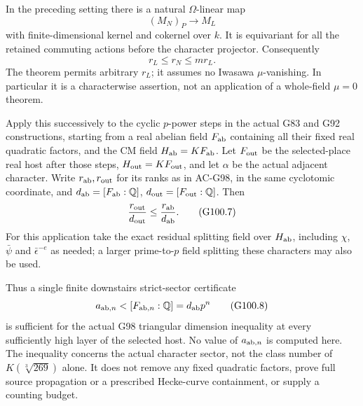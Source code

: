 \begin{theorem}
\label{thm:ACG100ascent}
In the preceding setting there is a natural $\Omega$-linear map
\[
                         (M_N)_P\longrightarrow M_L
 \tag{G100.5}
\]
with finite-dimensional kernel and cokernel over $k$.
It is equivariant for all the retained commuting actions before
the character projector.  Consequently
\[
                 r_L\le r_N\le m r_L.
 \tag{G100.6}
\]
The theorem permits arbitrary $r_L$; it assumes no Iwasawa
$\mu$-vanishing.  In particular it is a characterwise assertion,
not an application of a whole-field $\mu=0$ theorem.

Apply this successively to the cyclic $p$-power steps in the actual
G83 and G92 constructions, starting from a real abelian field
$F_{\rm ab}$ containing all their fixed real quadratic factors,
and the CM field $H_{\rm ab}=KF_{\rm ab}$.
Let $F_{\rm out}$ be the selected-place real host after those steps,
$H_{\rm out}=KF_{\rm out}$, and let $\alpha$ be the actual adjacent
character.  Write $r_{\rm ab},r_{\rm out}$ for its ranks as in
AC-G98, in the same cyclotomic coordinate, and
$d_{\rm ab}=[F_{\rm ab}:\mathbb Q]$,
$d_{\rm out}=[F_{\rm out}:\mathbb Q]$.
Then
\[
                 \frac{r_{\rm out}}{d_{\rm out}}
                       \le \frac{r_{\rm ab}}{d_{\rm ab}}.
 \tag{G100.7}
\]
For this application take the exact residual splitting field over
$H_{\rm ab}$, including $\chi$, $\bar\psi$ and
$\bar\epsilon^{-e}$ as needed; a larger prime-to-$p$ field
splitting these characters may also be used.

Thus a single finite downstairs strict-sector certificate
\[
 a_{{\rm ab},n}<[F_{{\rm ab},n}:\mathbb Q]
                        =d_{\rm ab}p^n
 \tag{G100.8}
\]
is sufficient for the actual G98 triangular dimension inequality
at every sufficiently high layer of the selected host.
No value of $a_{{\rm ab},n}$ is computed here.
The inequality concerns the actual character sector, not the class
number of $K(\sqrt[3]{269})$ alone.  It does not remove any fixed
quadratic factors, prove full source propagation or a prescribed
Hecke-curve containment, or supply a counting budget.
\end{theorem}

